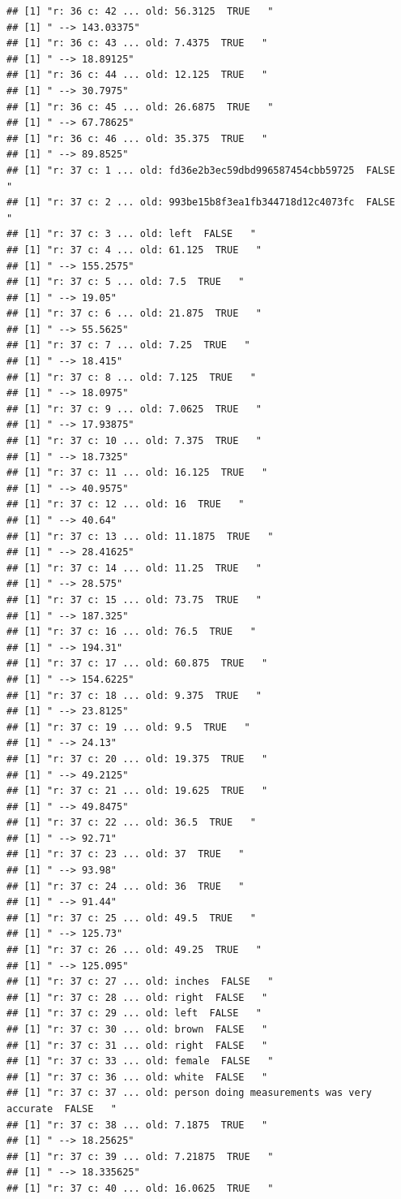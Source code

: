 \documentclass[]{article}
\begin{document}
\begin{verbatim}
## [1] "r: 36 c: 42 ... old: 56.3125  TRUE   "
## [1] " --> 143.03375"
## [1] "r: 36 c: 43 ... old: 7.4375  TRUE   "
## [1] " --> 18.89125"
## [1] "r: 36 c: 44 ... old: 12.125  TRUE   "
## [1] " --> 30.7975"
## [1] "r: 36 c: 45 ... old: 26.6875  TRUE   "
## [1] " --> 67.78625"
## [1] "r: 36 c: 46 ... old: 35.375  TRUE   "
## [1] " --> 89.8525"
## [1] "r: 37 c: 1 ... old: fd36e2b3ec59dbd996587454cbb59725  FALSE   "
## [1] "r: 37 c: 2 ... old: 993be15b8f3ea1fb344718d12c4073fc  FALSE   "
## [1] "r: 37 c: 3 ... old: left  FALSE   "
## [1] "r: 37 c: 4 ... old: 61.125  TRUE   "
## [1] " --> 155.2575"
## [1] "r: 37 c: 5 ... old: 7.5  TRUE   "
## [1] " --> 19.05"
## [1] "r: 37 c: 6 ... old: 21.875  TRUE   "
## [1] " --> 55.5625"
## [1] "r: 37 c: 7 ... old: 7.25  TRUE   "
## [1] " --> 18.415"
## [1] "r: 37 c: 8 ... old: 7.125  TRUE   "
## [1] " --> 18.0975"
## [1] "r: 37 c: 9 ... old: 7.0625  TRUE   "
## [1] " --> 17.93875"
## [1] "r: 37 c: 10 ... old: 7.375  TRUE   "
## [1] " --> 18.7325"
## [1] "r: 37 c: 11 ... old: 16.125  TRUE   "
## [1] " --> 40.9575"
## [1] "r: 37 c: 12 ... old: 16  TRUE   "
## [1] " --> 40.64"
## [1] "r: 37 c: 13 ... old: 11.1875  TRUE   "
## [1] " --> 28.41625"
## [1] "r: 37 c: 14 ... old: 11.25  TRUE   "
## [1] " --> 28.575"
## [1] "r: 37 c: 15 ... old: 73.75  TRUE   "
## [1] " --> 187.325"
## [1] "r: 37 c: 16 ... old: 76.5  TRUE   "
## [1] " --> 194.31"
## [1] "r: 37 c: 17 ... old: 60.875  TRUE   "
## [1] " --> 154.6225"
## [1] "r: 37 c: 18 ... old: 9.375  TRUE   "
## [1] " --> 23.8125"
## [1] "r: 37 c: 19 ... old: 9.5  TRUE   "
## [1] " --> 24.13"
## [1] "r: 37 c: 20 ... old: 19.375  TRUE   "
## [1] " --> 49.2125"
## [1] "r: 37 c: 21 ... old: 19.625  TRUE   "
## [1] " --> 49.8475"
## [1] "r: 37 c: 22 ... old: 36.5  TRUE   "
## [1] " --> 92.71"
## [1] "r: 37 c: 23 ... old: 37  TRUE   "
## [1] " --> 93.98"
## [1] "r: 37 c: 24 ... old: 36  TRUE   "
## [1] " --> 91.44"
## [1] "r: 37 c: 25 ... old: 49.5  TRUE   "
## [1] " --> 125.73"
## [1] "r: 37 c: 26 ... old: 49.25  TRUE   "
## [1] " --> 125.095"
## [1] "r: 37 c: 27 ... old: inches  FALSE   "
## [1] "r: 37 c: 28 ... old: right  FALSE   "
## [1] "r: 37 c: 29 ... old: left  FALSE   "
## [1] "r: 37 c: 30 ... old: brown  FALSE   "
## [1] "r: 37 c: 31 ... old: right  FALSE   "
## [1] "r: 37 c: 33 ... old: female  FALSE   "
## [1] "r: 37 c: 36 ... old: white  FALSE   "
## [1] "r: 37 c: 37 ... old: person doing measurements was very accurate  FALSE   "
## [1] "r: 37 c: 38 ... old: 7.1875  TRUE   "
## [1] " --> 18.25625"
## [1] "r: 37 c: 39 ... old: 7.21875  TRUE   "
## [1] " --> 18.335625"
## [1] "r: 37 c: 40 ... old: 16.0625  TRUE   "

\end{verbatim}
\end{document}
